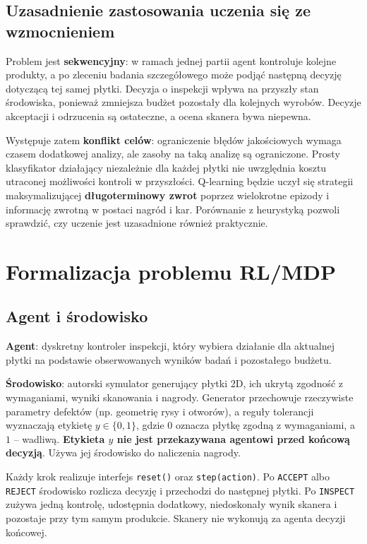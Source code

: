 \documentclass[12pt]{article}
\begin{document}
\subsection{Uzasadnienie zastosowania uczenia się ze wzmocnieniem}

Problem jest \textbf{sekwencyjny}: w ramach jednej partii agent kontroluje kolejne produkty, a po zleceniu badania szczegółowego może podjąć następną decyzję dotyczącą tej samej płytki. Decyzja o inspekcji wpływa na przyszły stan środowiska, ponieważ zmniejsza budżet pozostały dla kolejnych wyrobów. Decyzje akceptacji i odrzucenia są ostateczne, a ocena skanera bywa niepewna.

Występuje zatem \textbf{konflikt celów}: ograniczenie błędów jakościowych wymaga czasem dodatkowej analizy, ale zasoby na taką analizę są ograniczone. Prosty klasyfikator działający niezależnie dla każdej płytki nie uwzględnia kosztu utraconej możliwości kontroli w przyszłości. Q-learning będzie uczył się strategii maksymalizującej \textbf{długoterminowy zwrot} poprzez wielokrotne epizody i informację zwrotną w postaci nagród i kar. Porównanie z heurystyką pozwoli sprawdzić, czy uczenie jest uzasadnione również praktycznie.

\section{Formalizacja problemu RL/MDP}

\subsection{Agent i środowisko}

\textbf{Agent}: dyskretny kontroler inspekcji, który wybiera działanie dla aktualnej płytki na podstawie obserwowanych wyników badań i pozostałego budżetu.

\textbf{Środowisko}: autorski symulator generujący płytki 2D, ich ukrytą zgodność z wymaganiami, wyniki skanowania i nagrody. Generator przechowuje rzeczywiste parametry defektów (np. geometrię rysy i otworów), a reguły tolerancji wyznaczają etykietę \(y\in\{0,1\}\), gdzie \(0\) oznacza płytkę zgodną z wymaganiami, a \(1\) -- wadliwą. \textbf{Etykieta \(y\) nie jest przekazywana agentowi przed końcową decyzją}. Używa jej środowisko do naliczenia nagrody.

Każdy krok realizuje interfejs \texttt{reset()} oraz \texttt{step(action)}. Po \texttt{ACCEPT} albo \texttt{REJECT} środowisko rozlicza decyzję i przechodzi do następnej płytki. Po \texttt{INSPECT} zużywa jedną kontrolę, udostępnia dodatkowy, niedoskonały wynik skanera i pozostaje przy tym samym produkcie. Skanery nie wykonują za agenta decyzji końcowej.
\end{document}
